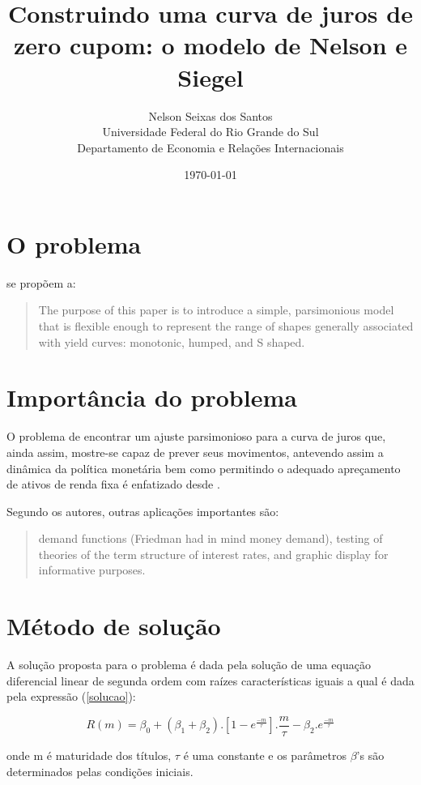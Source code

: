 \documentclass[a4paper, 11pt]{article}
\title{Construindo uma curva de juros de zero cupom: o modelo de Nelson e Siegel}
\author{Nelson Seixas dos Santos\\Universidade Federal do Rio Grande do Sul\\Departamento de Economia e Relações Internacionais}
\date{\today}
\begin{document}
\maketitle

\section{O problema}

\citet{nelsonsiegel1987}  se propõem a:

\begin{quote} 
The purpose of this paper is to introduce a simple, parsimonious model that is flexible enough to represent the range of shapes generally associated with yield curves: monotonic, humped, and S shaped. 
\end{quote}


\section{Importância do problema}

O problema de encontrar um ajuste parsimonioso para a curva de juros que, ainda assim, mostre-se capaz de prever seus movimentos, antevendo assim a dinâmica da política monetária bem como permitindo o adequado apreçamento de ativos de renda fixa é enfatizado desde \citet{friedman1977}.

Segundo os autores, outras aplicações importantes são:

\begin{quote}
demand functions (Friedman had in mind money demand), testing of  theories of the term structure of interest rates, and graphic display for informative purposes.
\end{quote}

\section{Método de solução}

A solução proposta para o problema é dada pela solução de uma equação diferencial linear de segunda ordem com raízes características iguais a qual é dada pela expressão (\ref{solucao}):

\begin{equation}\label{solucao}
R(m) = \beta_0 + \left( \beta_1 + \beta_2 \right) .\left[ 1 - e^{\frac{-m}{\tau}}\right].\frac{m}{\tau} - \beta_2 . e^{\frac{-m}{\tau}}
\end{equation}

onde m é maturidade dos títulos, $\tau$ é uma constante e os parâmetros $\beta$'s são determinados pelas condições iniciais.
\end{document}
